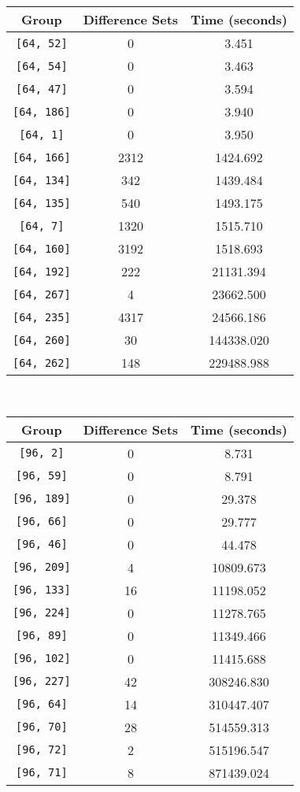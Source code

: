 \documentclass[a4paper,11pt]{report}
\begin{document}
{{ \begin{center}
\begin{tabular}{ccc}Group&
Difference Sets&
Time (seconds)\\
\hline
\texttt{[64, 52]}&
0&
3.451\\
\texttt{[64, 54]}&
0&
3.463\\
\texttt{[64, 47]}&
0&
3.594\\
\texttt{[64, 186]}&
0&
3.940\\
\texttt{[64, 1]}&
0&
3.950\\
\texttt{[64, 166]}&
2312&
1424.692\\
\texttt{[64, 134]}&
342&
1439.484\\
\texttt{[64, 135]}&
540&
1493.175\\
\texttt{[64, 7]}&
1320&
1515.710\\
\texttt{[64, 160]}&
3192&
1518.693\\
\texttt{[64, 192]}&
222&
21131.394\\
\texttt{[64, 267]}&
4&
23662.500\\
\texttt{[64, 235]}&
4317&
24566.186\\
\texttt{[64, 260]}&
30&
144338.020\\
\texttt{[64, 262]}&
148&
229488.988\\
\end{tabular}\\[2mm]
\end{center}

 \begin{center}
\begin{tabular}{ccc}Group&
Difference Sets&
Time (seconds)\\
\hline
\texttt{[96, 2]}&
0&
8.731\\
\texttt{[96, 59]}&
0&
8.791\\
\texttt{[96, 189]}&
0&
29.378\\
\texttt{[96, 66]}&
0&
29.777\\
\texttt{[96, 46]}&
0&
44.478\\
\texttt{[96, 209]}&
4&
10809.673\\
\texttt{[96, 133]}&
16&
11198.052\\
\texttt{[96, 224]}&
0&
11278.765\\
\texttt{[96, 89]}&
0&
11349.466\\
\texttt{[96, 102]}&
0&
11415.688\\
\texttt{[96, 227]}&
42&
308246.830\\
\texttt{[96, 64]}&
14&
310447.407\\
\texttt{[96, 70]}&
28&
514559.313\\
\texttt{[96, 72]}&
2&
515196.547\\
\texttt{[96, 71]}&
8&
871439.024\\
\end{tabular}\\[2mm]
\end{center}

}}
\end{document}
